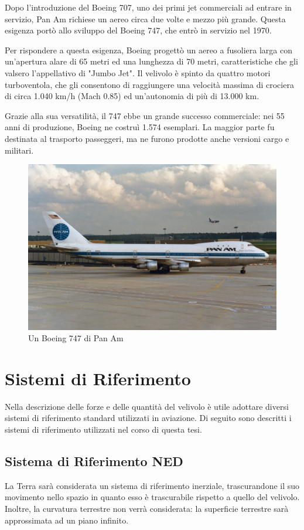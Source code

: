 Dopo l'introduzione del Boeing 707, uno dei primi jet commerciali ad entrare in servizio, Pan Am richiese un aereo circa due volte e mezzo più grande. Questa esigenza portò allo sviluppo del Boeing 747, che entrò in servizio nel 1970.

Per rispondere a questa esigenza, Boeing progettò un aereo a fusoliera larga con un'apertura alare di 65 metri ed una lunghezza di 70 metri, caratteristiche che gli valsero l'appellativo di "Jumbo Jet".
Il velivolo è spinto da quattro motori turboventola, che gli consentono di raggiungere una velocità massima di crociera di circa 1.040 km/h (Mach 0.85) ed un'autonomia di più di 13.000 km.

Grazie alla sua versatilità, il 747 ebbe un grande successo commerciale: nei 55 anni di produzione, Boeing ne costruì 1.574 esemplari. La maggior parte fu destinata al trasporto passeggeri, ma ne furono prodotte anche versioni cargo e militari.

\begin{figure}[H]
    \centering
    \includegraphics[width=0.65\linewidth]{Immagini/747.jpg}
    \caption{Un Boeing 747 di Pan Am \cite{747-image}}
\end{figure}

\newpage
\section{Sistemi di Riferimento}
Nella descrizione delle forze e delle quantità del velivolo è utile adottare diversi sistemi di riferimento standard utilizzati in aviazione.
Di seguito sono descritti i sistemi di riferimento utilizzati nel corso di questa tesi.

\subsection{Sistema di Riferimento NED}
La Terra sarà considerata un sistema di riferimento inerziale, trascurandone il suo movimento nello spazio in quanto esso è trascurabile rispetto a quello del velivolo.
Inoltre, la curvatura terrestre non verrà considerata: la superficie terrestre sarà approssimata ad un piano infinito.

